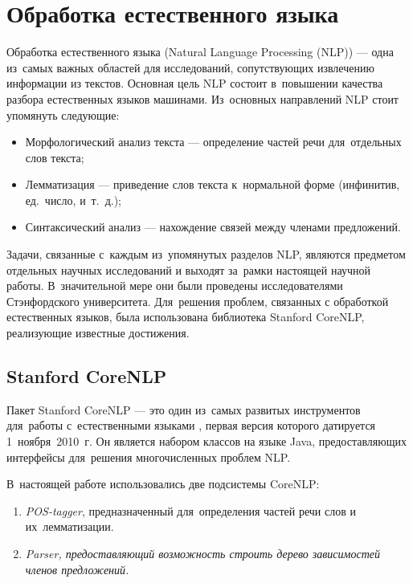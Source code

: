 \section{Обработка естественного языка}

Обработка естественного языка (Natural Language Processing (NLP))\cite{textminingsurvey} --- 
одна из~самых важных областей для исследований, сопутствующих извлечению информации из текстов.
Основная цель NLP состоит в~повышении качества разбора естественных языков машинами.
Из~основных направлений NLP стоит упомянуть следующие:

\begin{itemize}

\item {Морфологический анализ текста --- определение частей речи для~отдельных слов текста;}
\item {Лемматизация --- приведение слов текста к~нормальной форме (инфинитив, ед.~число, и~т.~д.);}
\item {Синтаксический анализ --- нахождение связей между членами предложений.}

\end{itemize}

Задачи, связанные с~каждым из~упомянутых разделов NLP, 
являются предметом отдельных научных исследований и выходят за~рамки настоящей научной работы.
В~значительной мере они были проведены исследователями Стэнфордского университета. 
Для~решения проблем, связанных с обработкой естественных языков, была использована библиотека  Stanford CoreNLP,
реализующие известные достижения.

\subsection{Stanford CoreNLP}
\label{st_corenlp}

Пакет Stanford CoreNLP --- это один из~самых развитых инструментов для~работы с~естественными языками \cite{corenlp}, 
первая версия которого датируется 1~ноября~2010~г.
Он является набором классов на языке Java, предоставляющих интерфейсы для~решения многочисленных проблем NLP. 

В~настоящей работе использовались две подсистемы CoreNLP:

\begin{enumerate}

\item {{\it POS-tagger}, предназначенный для~определения частей речи слов и их~лемматизации.}
\item {\it {Parser}, предоставляющий возможность строить дерево зависимостей членов предложений.}

\end{enumerate}


